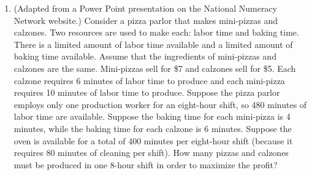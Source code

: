 \documentclass[12pt,dvipsnames]{article}
\begin{document}
\begin{enumerate}[resume,label=$\blacktriangleright$ {\bf  \arabic*:}]


\item (Adapted from a Power Point presentation on the National Numeracy Network website.) Consider a pizza parlor that makes mini-pizzas and calzones.  Two resources are used to make each:  labor time and baking time. There is a limited amount of labor time available and a limited amount of baking time available. Assume that the ingredients of mini-pizzas and calzones are the same. Mini-pizzas sell for \$7 and calzones sell for \$5. Each calzone requires 6 minutes of labor time to produce and each mini-pizza requires 10 minutes of labor time to produce.  Suppose the pizza parlor employs only one production worker for an eight-hour shift, so 480 minutes of labor time are available.  Suppose the baking time for each mini-pizza is 4 minutes, while the baking time for each calzone is 6 minutes.  Suppose the oven is available for a total of 400 minutes per eight-hour shift (because it requires 80 minutes of cleaning per shift). How many pizzas and calzones must be produced in one 8-hour shift in order to maximize the profit?

	
\end{enumerate}
\end{document}
